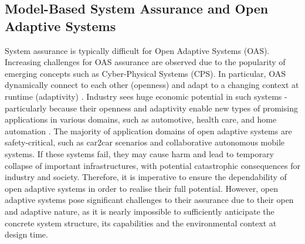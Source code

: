 \subsection{Model-Based System Assurance and Open Adaptive Systems}
System assurance is typically difficult for Open Adaptive Systems (OAS). 
Increasing challenges for OAS assurance are observed due to the popularity of emerging concepts such as Cyber-Physical Systems (CPS).
In particular, OAS dynamically connect to each other (openness) and adapt to a changing context at runtime (adaptivity) \cite{trapp2013safety}.
Industry sees huge economic potential in such systems - particularly because their openness and adaptivity enable new types of promising applications in various domains, such as automotive, health care, and home automation \cite{wei2017deis}.
The majority of application domains of open adaptive systems are safety-critical, such as car2car scenarios and collaborative autonomous mobile systems.
If these systems fail, they may cause harm and lead to temporary collapse of important infrastructures, with potential catastrophic consequences for industry and society.
Therefore, it is imperative to ensure the dependability of open adaptive systems in order to realise their full potential. 
However, open adaptive systems pose significant challenges to their assurance due to their open and adaptive nature, as it is nearly impossible to sufficiently anticipate the concrete system structure, its capabilities and the environmental context at design time.


